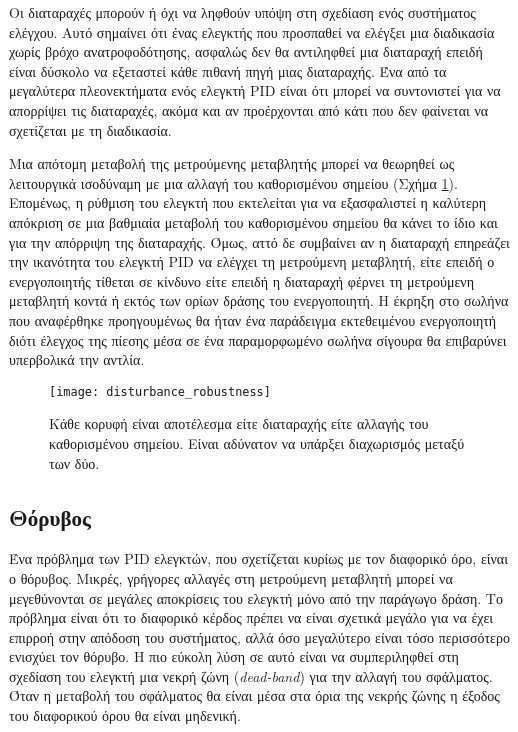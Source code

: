 Οι διαταραχές μπορούν ή όχι να ληφθούν υπόψη στη σχεδίαση ενός συστήματος ελέγχου. Αυτό σημαίνει ότι ένας ελεγκτής που προσπαθεί να ελέγξει μια διαδικασία χωρίς βρόχο ανατροφοδότησης, ασφαλώς δεν θα αντιληφθεί μια διαταραχή επειδή είναι δύσκολο να εξεταστεί κάθε πιθανή πηγή μιας διαταραχής. Ένα από τα μεγαλύτερα πλεονεκτήματα ενός ελεγκτή PID είναι ότι μπορεί να συντονιστεί για να απορρίψει τις διαταραχές, ακόμα και αν προέρχονται από κάτι που δεν φαίνεται να σχετίζεται με τη διαδικασία.

Μια απότομη μεταβολή της μετρούμενης μεταβλητής μπορεί να θεωρηθεί ως λειτουργικά ισοδύναμη με μια αλλαγή του καθορισμένου σημείου (Σχήμα \ref{fig:disturbance_robustness}). Επομένως, η ρύθμιση του ελεγκτή που εκτελείται για να εξασφαλιστεί η καλύτερη απόκριση σε μια βαθμιαία μεταβολή του καθορισμένου σημείου θα κάνει το ίδιο και για την απόρριψη της διαταραχής. Όμως, αττό δε συμβαίνει αν η διαταραχή επηρεάζει την ικανότητα του ελεγκτή PID να ελέγχει τη μετρούμενη μεταβλητή, είτε επειδή ο ενεργοποιητής τίθεται σε κίνδυνο είτε επειδή η διαταραχή φέρνει τη μετρούμενη μεταβλητή κοντά ή εκτός των ορίων δράσης του ενεργοποιητή. Η έκρηξη στο σωλήνα
που αναφέρθηκε προηγουμένως θα ήταν ένα παράδειγμα εκτεθειμένου ενεργοποιητή διότι έλεγχος της πίεσης μέσα σε ένα παραμορφωμένο σωλήνα σίγουρα θα επιβαρύνει υπερβολικά την αντλία.

\begin{figure}[h]
  \centering
  \texttt{[image: disturbance\_robustness]}
  \caption{Κάθε κορυφή είναι αποτέλεσμα είτε διαταραχής είτε αλλαγής του καθορισμένου σημείου. Είναι αδύνατον να υπάρξει διαχωρισμός μεταξύ των δύο.}
  \label{fig:disturbance_robustness}
\end{figure}

\subsection{Θόρυβος}

Ένα πρόβλημα των PID ελεγκτών, που σχετίζεται κυρίως με τον διαφορικό όρο, είναι ο θόρυβος. Μικρές, γρήγορες αλλαγές στη μετρούμενη μεταβλητή μπορεί να μεγεθύνονται σε μεγάλες αποκρίσεις του ελεγκτή μόνο από την παράγωγο δράση. Το πρόβλημα είναι ότι το διαφορικό κέρδος πρέπει να είναι σχετικά μεγάλο για να έχει επιρροή στην απόδοση του συστήματος, αλλά όσο μεγαλύτερο είναι τόσο περισσότερο ενισχύει τον θόρυβο. Η πιο εύκολη λύση σε αυτό είναι να συμπεριληφθεί στη σχεδίαση του ελεγκτή μια νεκρή ζώνη (\emph{dead-band}) για την αλλαγή του σφάλματος. Όταν η μεταβολή του σφάλματος θα είναι μέσα στα όρια της νεκρής ζώνης η έξοδος του διαφορικού όρου θα είναι μηδενική.


